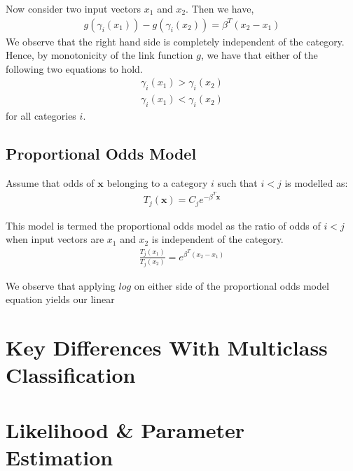 \documentclass[a4paper, 11pt]{article}
\begin{document}
Now consider two input vectors \textbf{$x_1$} and \textbf{$x_2$}. Then we have,
\begin{align}
    g(\gamma_i(\textbf{$x_1$})) - g(\gamma_i(\textbf{$x_2$})) = \beta^T(\textbf{$x_2$} - \textbf{$x_1$})
\end{align}
We observe that the right hand side is completely independent of the category. Hence, by monotonicity of the link function $g$, we have that either of the following two equations to hold.
\begin{align}
    \gamma_i(\textbf{$x_1$}) > \gamma_i(\textbf{$x_2$}) \\
    \gamma_i(\textbf{$x_1$}) < \gamma_i(\textbf{$x_2$})
\end{align}
for all categories $i$.

\subsection{Proportional Odds Model}
Assume that odds of $\textbf{x}$ belonging to a category $i$ such that $i < j$ is modelled as:
\begin{align} 
    T_j(\textbf{x}) = C_j e^{-\beta^T\textbf{x}}
\end{align}

This model is termed the proportional odds model as the ratio of odds of $i < j$ when input vectors are \textbf{$x_1$} and \textbf{$x_2$} is independent of the category.
\begin{align}
    \frac{T_j(\textbf{$x_1$})}{T_j(\textbf{$x_2$})} = e^{\beta^T(\textbf{$x_2$} - \textbf{$x_1$})}
\end{align}

We observe that applying $log$ on either side of the proportional odds model equation yields our linear 

\section{Key Differences With Multiclass Classification}

\section{Likelihood \& Parameter Estimation}



\end{document}
